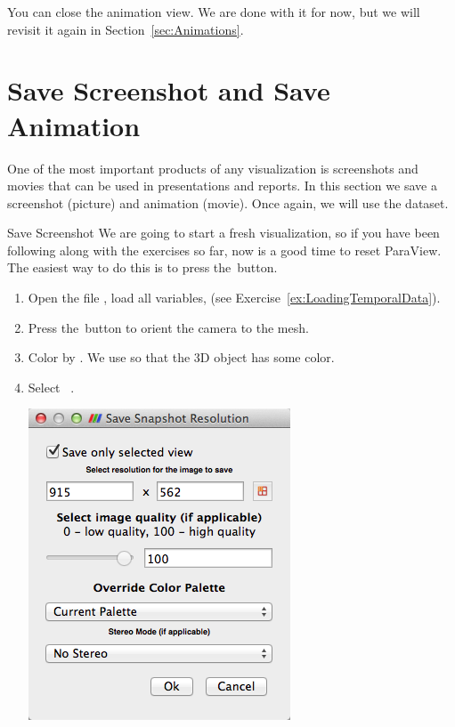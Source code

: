 You can close the animation view. We are done with it for now, but we will
revisit it again in Section~\ref{sec:Animations}.


\section{Save Screenshot and Save Animation}
\label{sec:SaveScreenshot}

One of the most important products of any visualization is screenshots and 
movies that can be used in presentations and reports.  In this section we 
save a screenshot (picture) and animation (movie). Once again, we
will use the  dataset.


\begin{exercise}{Save Screenshot}
  \label{ex:SaveScreenshot}%
  We are going to start a fresh visualization, so if you have been
  following along with the exercises so far, now is a good time to reset
  ParaView.  The easiest way to do this is to press the~\disconnect button.

  \begin{enumerate}
  \item Open the file , load all variables, \apply (see
    Exercise~\ref{ex:LoadingTemporalData}).
  \item Press the~\yPlus button to orient the camera to the mesh.
  \item Color by .  We use  so that the
    3D object has some color.
  \item Select  \ra {}~.

  \begin{inlinefig}
    \includegraphics[width=.8\scw]{images/SaveScreenshot1}
  \end{inlinefig}


\end{enumerate}
\end{exercise}
